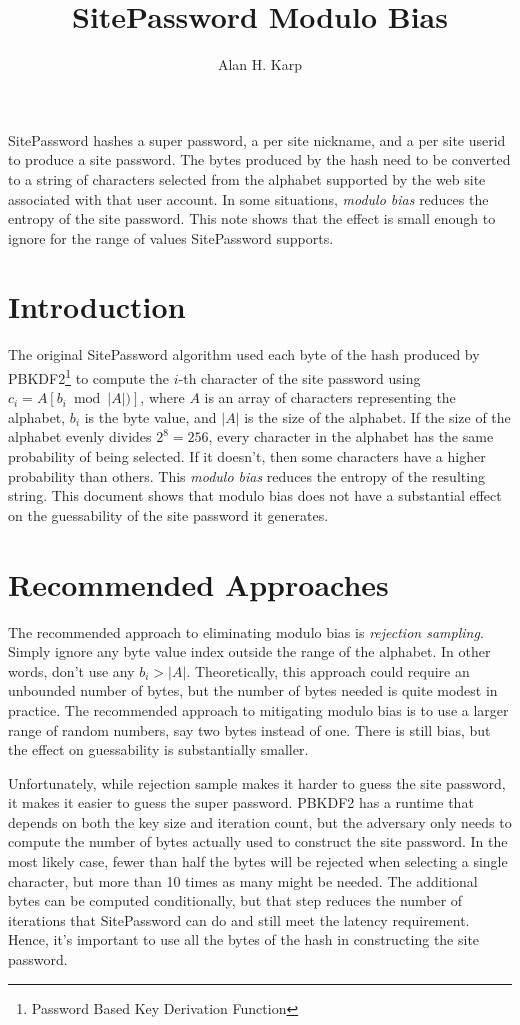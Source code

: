 \documentclass[11pt, oneside]{article}   	%
\title{SitePassword Modulo Bias}
\author{Alan H. Karp}
\begin{document}
\maketitle
\abstract

SitePassword hashes  a super password, a per site nickname, and a per site userid to produce a site password.  The bytes produced by the hash need to be converted to a string of characters selected from the alphabet supported by the web site associated with that user account.  In some situations, {\em modulo bias} reduces the entropy of the site password.  This note shows that the effect is small enough to ignore for the range of values SitePassword supports.

\section{Introduction}

The original SitePassword algorithm used each byte of the hash produced by PBKDF2\footnote{Password Based Key Derivation Function} to compute the $i$-th character of the site password using $c_i = A[b_i  \bmod  |A|)]$, where $A$ is an array of characters representing the alphabet, $b_i$ is the byte value, and $|A|$ is the size of the alphabet.  If the size of the alphabet evenly divides $2^8 = 256$, every character in the alphabet has the same probability of being selected.  If it doesn't, then some characters have a higher probability than others.  This {\em modulo bias} reduces the entropy of the resulting string.  This document shows that modulo bias does not have a substantial effect on the guessability of the site password it generates.

\section{Recommended Approaches}

The recommended approach to eliminating modulo bias is {\em rejection sampling}.  Simply ignore any byte value index outside the range of the alphabet.  In other words, don't use any $b_i > |A|$.  Theoretically, this approach could require an unbounded number of bytes, but the number of bytes needed is quite modest in practice.  The recommended approach to mitigating modulo bias is to use a larger range of random numbers, say two bytes instead of one.  There is still bias, but the effect on guessability is substantially smaller.

Unfortunately, while rejection sample makes it harder to guess the site password, it makes it easier to guess the super password.  PBKDF2 has a runtime that depends on both the key size and iteration count, but the adversary only needs to compute the number of bytes actually used to construct the site password.  In the most likely case, fewer than half the bytes will be rejected when selecting a single character, but more than 10 times as many might be needed.  The additional bytes can be computed conditionally, but that step reduces the number of iterations that SitePassword can do and still meet the latency requirement.  Hence, it's important to use all the bytes of the hash in constructing the site password.
\end{document}
